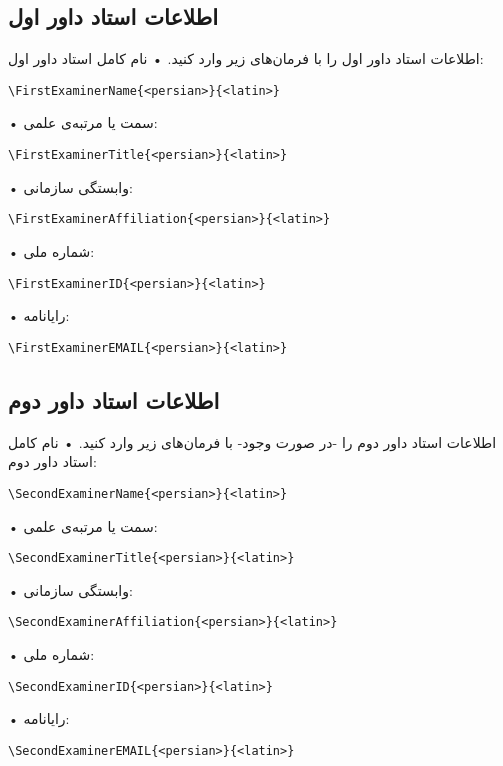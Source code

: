 \documentclass[%
12pt,%
twoside, %
openany, %
notitlepage,%
fleqn,%
]{article}
\numberwithin{equation}{section} %
\begin{document}
\subsection{اطلاعات استاد داور اول}
اطلاعات استاد داور اول را با فرمان‌های زیر وارد کنید\@. 
• نام کامل استاد داور اول:
\begin{latin}\begin{verbatim}
\FirstExaminerName{<persian>}{<latin>}
\end{verbatim} \end{latin}
• سمت یا مرتبه‌ی علمی:
\begin{latin}\begin{verbatim}
\FirstExaminerTitle{<persian>}{<latin>}
\end{verbatim} \end{latin}
• وابستگی سازمانی:
\begin{latin}\begin{verbatim}
\FirstExaminerAffiliation{<persian>}{<latin>}
\end{verbatim} \end{latin}
• شماره ملی:
\begin{latin}\begin{verbatim}
\FirstExaminerID{<persian>}{<latin>}
\end{verbatim} \end{latin}
• رایانامه:
\begin{latin}\begin{verbatim}
\FirstExaminerEMAIL{<persian>}{<latin>}
\end{verbatim} \end{latin}

\subsection{اطلاعات استاد داور دوم}
اطلاعات استاد داور دوم را -در صورت وجود- با فرمان‌های زیر وارد کنید\@. 
• نام کامل استاد داور دوم:
\begin{latin}\begin{verbatim}
\SecondExaminerName{<persian>}{<latin>}
\end{verbatim} \end{latin}
• سمت یا مرتبه‌ی علمی:
\begin{latin}\begin{verbatim}
\SecondExaminerTitle{<persian>}{<latin>}
\end{verbatim} \end{latin}
• وابستگی سازمانی:
\begin{latin}\begin{verbatim}
\SecondExaminerAffiliation{<persian>}{<latin>}
\end{verbatim} \end{latin}
• شماره ملی:
\begin{latin}\begin{verbatim}
\SecondExaminerID{<persian>}{<latin>}
\end{verbatim} \end{latin}
• رایانامه:
\begin{latin}\begin{verbatim}
\SecondExaminerEMAIL{<persian>}{<latin>}
\end{verbatim} \end{latin}
\end{document}
